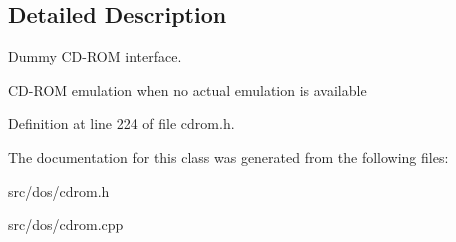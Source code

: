 \subsection{Detailed Description}
Dummy C\-D-\/\-R\-O\-M interface. 

C\-D-\/\-R\-O\-M emulation when no actual emulation is available 

Definition at line 224 of file cdrom.\-h.



The documentation for this class was generated from the following files\-:\begin{DoxyCompactItemize}
\item 
src/dos/cdrom.\-h\item 
src/dos/cdrom.\-cpp\end{DoxyCompactItemize}
